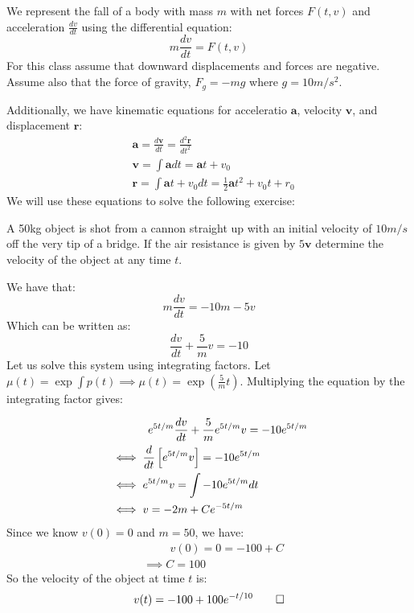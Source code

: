 \begin{example}
    We represent the fall of a body with mass $m$ with net forces $F(t, v)$ and acceleration $\frac{dv}{dt}$ using the differential equation:
    \[m \frac{dv}{dt} = F(t,v)\]
    For this class assume that downward displacements and forces are negative. Assume also that the force of gravity, $F_g = -mg$ where $g = 10 m/s^2$. 

    Additionally, we have kinematic equations for acceleratio $\mathbf{a}$, velocity $\mathbf{v}$, and displacement $\mathbf{r}$:
    \begin{align*}
        &\mathbf{a} = \frac{d\mathbf{v}}{dt} = \frac{d^2\mathbf{r}}{dt^2} \\
        &\mathbf{v} = \int \mathbf{a} dt = \mathbf{a}t + v_0 \\
        &\mathbf{r} = \int \mathbf{a}t + v_0 dt = \frac{1}{2}\mathbf{a}t^2 + v_0t + r_0
    \end{align*}
    We will use these equations to solve the following exercise:
\end{example}

\begin{example}
    A 50kg object is shot from a cannon straight up with an initial velocity of $10 m/s$ off the very tip of a bridge. If the air resistance is given by $5\mathbf{v}$ determine the velocity of the object at any time $t$.
\end{example}
\begin{solution}
    We have that:
    \[ m \frac{dv}{dt} = -10m - 5v \]
    Which can be written as:
    \[ \frac{dv}{dt} + \frac{5}{m}v = -10\]
    Let us solve this system using integrating factors. Let $\mu(t) = \exp \int p(t) \implies \mu(t) = \exp(\frac{5}{m}t)$. Multiplying the equation by the integrating factor gives:
\end{solution}
    \begin{align*}
        &\hspace{1.2cm} e^{5t/m}\frac{dv}{dt} + \frac{5}{m}e^{5t/m}v = -10e^{5t/m} \\
        &\iff \frac{d}{dt}\left[e^{5t/m}v\right] = -10e^{5t/m} \\
        &\iff e^{5t/m}v = \int -10e^{5t/m} dt \\
        &\iff v = -2m + Ce^{-5t/m}
    \end{align*}
    Since we know $v(0) = 0$ and $m = 50$, we have:
    \begin{align*}
        &\hspace{1cm} v(0) = 0 = -100 + C \\
        &\implies C = 100
    \end{align*}
    So the velocity of the object at time $t$ is:
    \[v(t) = -100 + 100e^{-t/10} \qedhere \]

